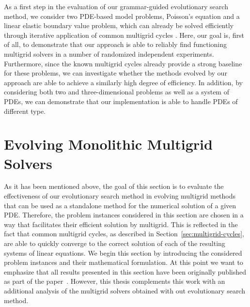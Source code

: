 As a first step in the evaluation of our grammar-guided evolutionary search method, we consider two PDE-based model problems, Poisson's equation and a linear elastic boundary value problem, which can already be solved efficiently through iterative application of common multigrid cycles .
Here, our goal is, first of all, to demonstrate that our approach is able to reliably find functioning multigrid solvers in a number of randomized independent experiments.
Furthermore, since the known multigrid cycles already provide a strong baseline for these problems, we can investigate whether the methods evolved by our approach are able to achieve a similarly high degree of efficiency.
In addition, by considering both two and three-dimensional problems as well as a system of PDEs, we can demonstrate that our implementation is able to handle PDEs of different type.
\section{Evolving Monolithic Multigrid Solvers}
As it has been mentioned above, the goal of this section is to evaluate the effectiveness of our evolutionary search method in evolving multigrid methods that can be used as a standalone method for the numerical solution of a given PDE.
Therefore, the problem instances considered in this section are chosen in a way that facilitates their efficient solution by multigrid.
This is reflected in the fact that common multigrid cycles, as described in Section~\ref{sec:multigrid-cycles}, are able to quickly converge to the correct solution of each of the resulting systems of linear equations.
We begin this section by introducing the considered problem instances and their mathematical formulation.
At this point we want to emphasize that all results presented in this section have been originally published as part of the paper~\cite{schmitt2021evostencils}.
However, this thesis complements this work with an additional analysis of the multigrid solvers obtained with out evolutionary search method.
